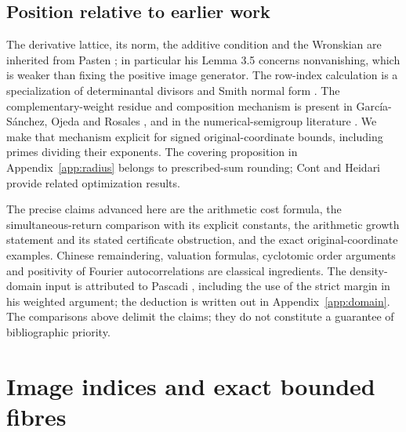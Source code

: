 \documentclass[11pt,a4paper]{article}
\theoremstyle{definition}\newtheorem{question}[theorem]{Question}
\theoremstyle{remark}\newtheorem{remark}[theorem]{Remark}
\begin{document}
\subsection{Position relative to earlier work}
The derivative lattice, its norm, the additive condition and the
Wronskian are inherited from Pasten \cite{Pasten}; in particular his
Lemma 3.5 concerns nonvanishing, which is weaker than fixing the
positive image generator. The row-index calculation is a specialization
of determinantal divisors and Smith normal form
\cite[Theorem 2.4]{Stanley}. The complementary-weight residue and
composition mechanism is present in Garc\'ia-S\'anchez, Ojeda and
Rosales \cite[Proposition 1(c) and Example 12]{UniqueBetti}, and in
the numerical-semigroup literature
\cite[Section 3.1]{Autry}\cite[Proposition 5.5]{CyrusianKaplan}.
We make that mechanism explicit for signed original-coordinate bounds,
including primes dividing their exponents. The covering proposition
in Appendix~\ref{app:radius} belongs to prescribed-sum rounding;
Cont and Heidari \cite{ContHeidari} provide related optimization results.

The precise claims advanced here are the arithmetic cost formula,
the simultaneous-return comparison with its explicit constants,
the arithmetic growth statement and its stated certificate obstruction,
and the exact original-coordinate examples. Chinese remaindering,
valuation formulas, cyclotomic order arguments and positivity of Fourier
autocorrelations are classical ingredients. The density-domain input
is attributed to Pascadi \cite{Pascadi}, including the use of the
strict margin in his weighted argument; the deduction is written out
in Appendix~\ref{app:domain}. The comparisons above delimit the claims;
they do not constitute a guarantee of bibliographic priority.

\section{Image indices and exact bounded fibres}\label{sec:fibres}
\end{document}
